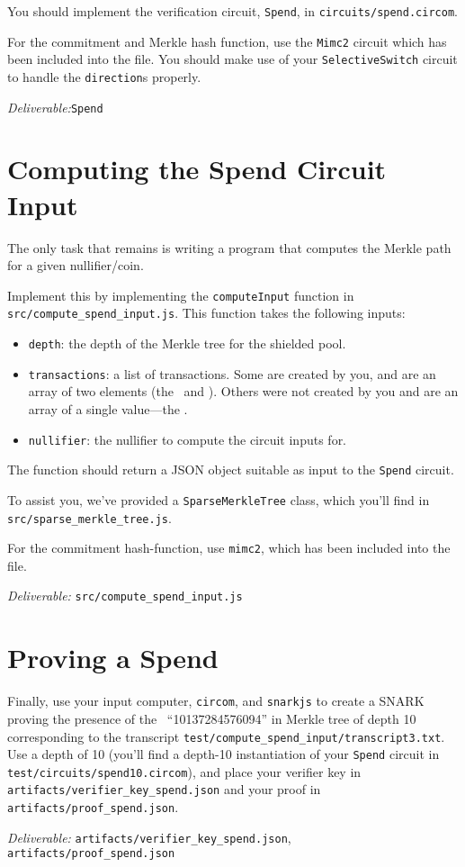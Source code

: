 \documentclass[12pt]{article}
\newcommand{\deliverable}[1]{\begin{tcolorbox}[colback=Gold!8]
\emph{Deliverable:}\xspace #1

\end{tcolorbox}}
\begin{document}
You should implement the verification circuit, \texttt{Spend}, in
\texttt{circuits/spend.circom}.

For the commitment and Merkle hash function, use the \texttt{Mimc2} circuit
which has been included into the file. You should make use of your
\texttt{SelectiveSwitch} circuit to handle the \texttt{direction}s properly.

\deliverable{\texttt{Spend}}

\section{Computing the Spend Circuit Input}

The only task that remains is writing a program that computes the Merkle path
for a given nullifier/coin.

Implement this by implementing the \texttt{computeInput} function in
\texttt{src/compute\_spend\_input.js}. This function takes the following inputs:
\begin{itemize}
  \item \texttt{depth}: the depth of the Merkle tree for the shielded pool.
  \item \texttt{transactions}: a list of transactions. Some are created by you,
    and are an array of two elements (the \nullifier\ and \nonce). Others were
    not created by you and are an array of a single value---the \commitment.
  \item \texttt{nullifier}: the nullifier to compute the circuit inputs for.
\end{itemize}
The function should return a JSON object suitable as input to the
\texttt{Spend} circuit.

To assist you, we've provided a \texttt{SparseMerkleTree} class, which you'll
find in \texttt{src/sparse\_merkle\_tree.js}.

For the commitment hash-function, use \texttt{mimc2}, which has been included
into the file.

\deliverable{%
\texttt{src/compute\_spend\_input.js}
}

\section{Proving a Spend}

Finally, use your input computer, \texttt{circom}, and \texttt{snarkjs} to
create a SNARK proving the presence of the \nullifier\ ``10137284576094'' in
Merkle tree of depth 10 corresponding to the transcript
\texttt{test/compute\_spend\_input/transcript3.txt}. Use a depth of 10 (you'll
find a depth-10 instantiation of your \texttt{Spend} circuit in
\texttt{test/circuits/spend10.circom}), and place your verifier key in
\texttt{artifacts/verifier\_key\_spend.json} and your proof in
\texttt{artifacts/proof\_spend.json}.
\deliverable{%
\texttt{artifacts/verifier\_key\_spend.json},
\texttt{artifacts/proof\_spend.json}
}
\end{document}
